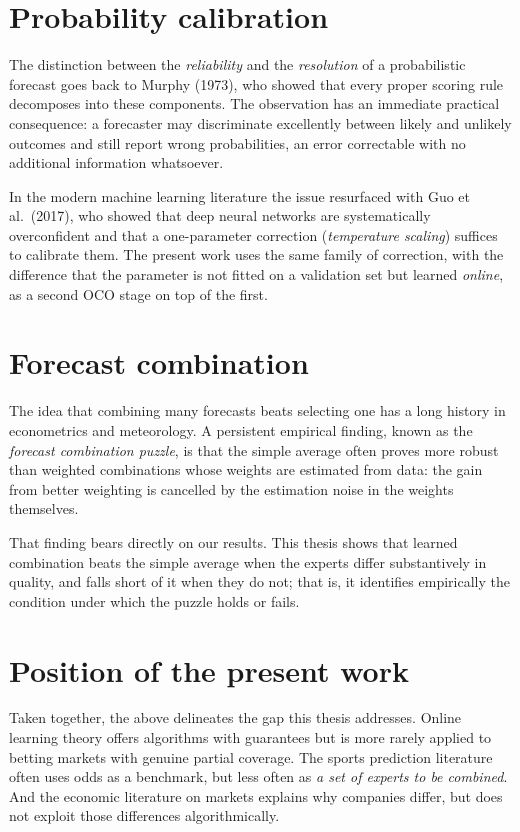 \documentclass[12pt,a4paper,oneside]{report}
\renewcommand{\_}{\oldunderscore\allowbreak}
\theoremstyle{definition}
\theoremstyle{plain}
\theoremstyle{remark}
\begin{document}
\section{Probability calibration}

The distinction between the \emph{reliability} and the \emph{resolution} of a probabilistic
forecast goes back to Murphy (1973), who showed that every proper scoring rule decomposes into
these components. The observation has an immediate practical consequence: a forecaster may
discriminate excellently between likely and unlikely outcomes and still report wrong
probabilities, an error correctable with no additional information whatsoever.

In the modern machine learning literature the issue resurfaced with Guo et al.\ (2017), who
showed that deep neural networks are systematically overconfident and that a one-parameter
correction (\emph{temperature scaling}) suffices to calibrate them. The present work uses the
same family of correction, with the difference that the parameter is not fitted on a validation
set but learned \emph{online}, as a second OCO stage on top of the first.

\section{Forecast combination}

The idea that combining many forecasts beats selecting one has a long history in econometrics
and meteorology. A persistent empirical finding, known as the \emph{forecast combination
puzzle}, is that the simple average often proves more robust than weighted combinations whose
weights are estimated from data: the gain from better weighting is cancelled by the estimation
noise in the weights themselves.

That finding bears directly on our results. This thesis shows that learned combination beats
the simple average when the experts differ substantively in quality, and falls short of it
when they do not; that is, it identifies empirically the condition under which the puzzle holds
or fails.

\section{Position of the present work}

Taken together, the above delineates the gap this thesis addresses. Online learning theory
offers algorithms with guarantees but is more rarely applied to betting markets with genuine
partial coverage. The sports prediction literature often uses odds as a benchmark, but less
often as \emph{a set of experts to be combined}. And the economic literature on markets
explains why companies differ, but does not exploit those differences algorithmically.
\end{document}

